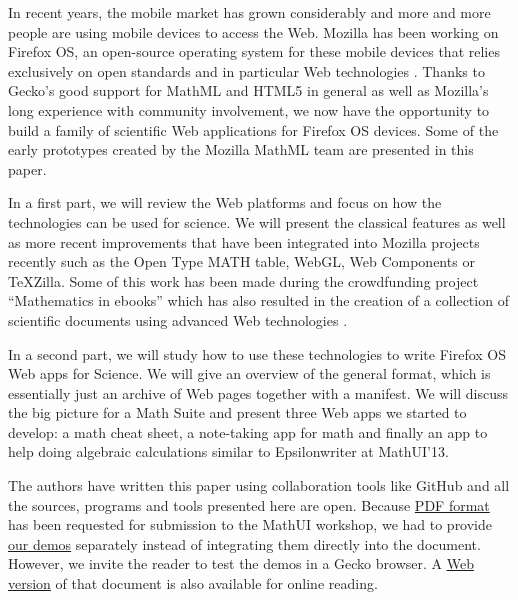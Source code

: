 In recent years, the mobile market has grown considerably and more and more
people are using mobile devices to access the Web. Mozilla has been working
on Firefox OS, an open-source operating system for these mobile devices that
relies exclusively on open standards and in particular Web technologies
\cite{MozillaFirefoxOS}. Thanks to
Gecko's good support for MathML and HTML5 in general as well as
Mozilla's long experience with community involvement, we now have the opportunity
to build a family of scientific Web applications for Firefox OS devices.
Some of the early prototypes created by the Mozilla MathML team are presented
in this paper.

In a first part, we will review the Web platforms and focus on how the
technologies
can be used for science. We will present the classical features
as well as more recent improvements that have been integrated into Mozilla
projects recently such as the Open Type MATH table, WebGL, Web Components or
TeXZilla. Some of this work has been made during the crowdfunding project
``Mathematics in ebooks'' which has also resulted in the creation of a collection
of scientific documents using advanced Web technologies \cite{MathInEbooks}.

In a second
part, we will study how to use these technologies to write Firefox OS Web apps
for Science. We will give an overview of the general format, which is
essentially just an archive of Web pages together with a manifest. We will
discuss the big picture for a Math Suite and present three Web apps we started
to develop: a math cheat sheet, a note-taking app for math and finally an app
to help doing algebraic calculations similar to Epsilonwriter at MathUI'13.

The authors have written this paper using collaboration tools like GitHub and
all the sources, programs and tools presented here are open. Because 
\href{http://fred-wang.github.io/MathUI2014/paper/output/MathUI2014-MozillaMathML.pdf}{PDF format}
has been requested for submission to the MathUI workshop, we had to provide
\href{http://fred-wang.github.io/MathUI2014/demos/}{our demos} separately instead of integrating them directly into the document.
However, we invite the reader to test the demos in a Gecko browser. A 
\href{http://fred-wang.github.io/MathUI2014/paper/output/}{Web version} of that document is also available for online reading.
